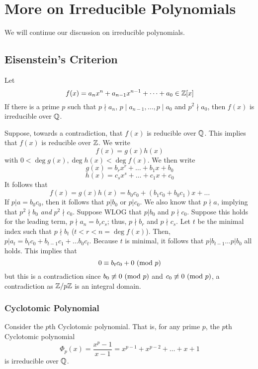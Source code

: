 \documentclass[letterpaper]{article}
\begin{document}
\section{More on Irreducible Polynomials}
We will continue our discussion on irreducible polynomials.

\subsection{Eisenstein's Criterion}
\begin{theorem}{}{}
    Let 
    \[f(x) = a_n x^n + a_{n - 1} x^{n - 1} + \dots + a_0 \in \mathbb{Z}[x]\]
    If there is a prime $p$ such that $p \nmid a_n$, $p \mid a_{n - 1}, \ldots, p \mid a_0$ and $p^2 \nmid a_0$, then $f(x)$ is irreducible over $\mathbb{Q}$.  
\end{theorem}

\begin{mdframed}[]
    Suppose, towards a contradiction, that $f(x)$ is reducible over $\mathbb{Q}$. This implies that $f(x)$ is reducible over $\mathbb{Z}$. We write 
    \[f(x) = g(x) h(x)\]
    with $0 < \deg g(x), \deg h(x) < \deg f(x)$. We then write 
    \[g(x) = b_r x^r + \ldots + b_1 x + b_0\]
    \[h(x) = c_s x^s + \ldots + c_1 x + c_0\]
    It follows that 
    \[f(x) = g(x) h(x) = b_0 c_0 + (b_1 c_0 + b_0 c_1) x + \ldots\]
    If $p | a = b_0 c_0$, then it follows that $p | b_0$ or $p | c_0$. We also know that $p \nmid a$, implying that $p^2 \nmid b_0$ \emph{and} $p^2 \nmid c_0$. Suppose WLOG that $p | b_0$ and $p \nmid c_0$. Suppose this holds for the leading term, $p \nmid a_n = b_r c_s$; thus, $p \nmid b_r$ and $p \nmid c_s$. Let $t$ be the minimal index such that $p \nmid b_t$ ($t < r < n = \deg f(x)$). Then, $p | a_t = b_t c_0 + b_{t - 1}c_1 + \ldots b_0 c_t$. Because $t$ is minimal, it follows that $p | b_{t - 1} \ldots p | b_0$ all holds. This implies that 
    \[0 \equiv b_t c_0 + 0 \ (\mathrm{mod}\ p)\]
    but this is a contradiction since $b_0 \not\equiv 0 \ (\mathrm{mod}\ p)$ and $c_0 \not\equiv 0 \ (\mathrm{mod}\ p)$, a contradiction as $\mathbb{Z} / p\mathbb{Z}$ is an integral domain. 
\end{mdframed}

\subsubsection{Cyclotomic Polynomial}
Consider the $p$th Cyclotomic polynomial. That is, for any prime $p$, the $p$th Cyclotomic polynomial
\[\Phi_{p}(x) = \frac{x^p - 1}{x - 1} = x^{p - 1} + x^{p - 2} + \ldots + x + 1\]
is irreducible over $\mathbb{Q}$. 
\end{document}
